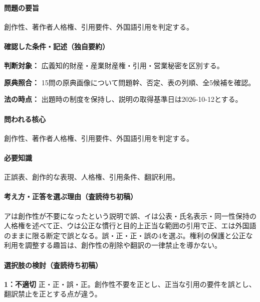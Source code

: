\paragraph{問題の要旨} 創作性、著作者人格権、引用要件、外国語引用を判定する。

\paragraph{確認した条件・記述（独自要約）}\mbox{}\par

\noindent\textbf{判断対象：} 広義知的財産・産業財産権・引用・営業秘密を区別する。\par

\noindent\textbf{原典照合：} 15問の原典画像について問題幹、否定、表の列順、全5候補を確認。\par

\noindent\textbf{法の時点：} 出題時の制度を保持し、説明の取得基準日は2026-10-12とする。\par

\paragraph{問われる核心} 創作性、著作者人格権、引用要件、外国語引用を判定する。

\paragraph{必要知識} 正誤表、創作的な表現、人格権、引用条件、翻訳利用。

\paragraph{考え方・正答を選ぶ理由（査読待ち初稿）} アは創作性が不要になったという説明で誤、イは公表・氏名表示・同一性保持の人格権を述べて正、ウは公正な慣行と目的上正当な範囲の引用で正、エは外国語のままに限る断定で誤となる。誤・正・正・誤の4を選ぶ。権利の保護と公正な利用を調整する趣旨は、創作性の削除や翻訳の一律禁止を導かない。

\paragraph{選択肢の検討（査読待ち初稿）}\mbox{}\par

\noindent\textbf{1：不適切} 正・正・誤・正。創作性不要を正とし、正当な引用の要件を誤とし、翻訳禁止を正とする点が違う。\par

